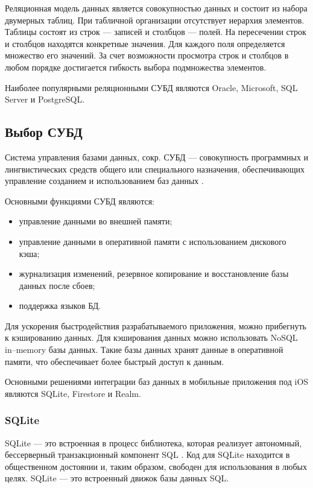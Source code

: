 Реляционная модель данных является совокупностью данных и состоит из набора двумерных таблиц. При табличной организации отсутствует иерархия элементов. Таблицы состоят из строк --- записей и столбцов --- полей. На пересечении строк и столбцов находятся конкретные значения. Для каждого поля определяется множество его значений. За счет возможности просмотра строк и столбцов в любом порядке достигается гибкость выбора подмножества элементов.

Наиболее популярными реляционными СУБД являются Oracle, Microsoft, SQL Server и PostgreSQL.

\subsection{Выбор СУБД}

Система управления базами данных, сокр. СУБД --- совокупность программных и лингвистических средств общего или специального назначения, обеспечивающих управление созданием и использованием баз данных \cite{subd}.

Основными функциями СУБД являются:

\begin{itemize}[label=---]
	\item управление данными во внешней памяти;
	\item управление данными в оперативной памяти с использованием дискового кэша;
	\item журнализация изменений, резервное копирование и восстановление базы данных после сбоев;
	\item поддержка языков БД.
\end{itemize}

Для ускорения быстродействия разрабатываемого приложения, можно прибегнуть к кэшированию данных. Для кэширования данных можно использовать NoSQL \cite{nosql} in--memory базы данных. Такие базы данных хранят данные в оперативной памяти, что обеспечивает более быстрый доступ к данным.

Основными решениями интеграции баз данных в мобильные приложения под iOS являются SQLite, Firestore и Realm.

\subsubsection{SQLite}

SQLite --- это встроенная в процесс библиотека, которая реализует автономный, бессерверный транзакционный компонент SQL  \cite{sqlite}. Код для SQLite находится в общественном достоянии и, таким образом, свободен для использования в любых целях. SQLite --- это встроенный движок базы данных SQL. 

